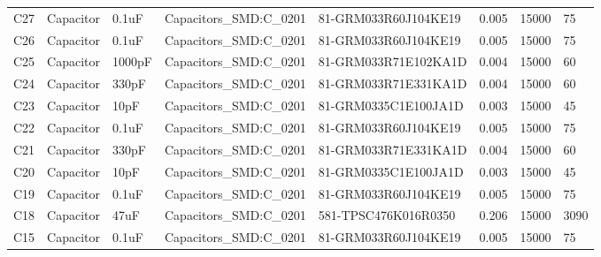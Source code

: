 \begin{landscape}
\begin{table}[]
\begin{tabular}{llllllll}
C27            & Capacitor     & 0.1uF                      & Capacitors\_SMD:C\_0201         & 81-GRM033R60J104KE19                 & 0.005                & 15000           & 75                   \\
C26            & Capacitor     & 0.1uF                      & Capacitors\_SMD:C\_0201         & 81-GRM033R60J104KE19                 & 0.005                & 15000           & 75                   \\
C25            & Capacitor     & 1000pF                     & Capacitors\_SMD:C\_0201         & 81-GRM033R71E102KA1D                 & 0.004                & 15000           & 60                   \\
C24            & Capacitor     & 330pF                      & Capacitors\_SMD:C\_0201         & 81-GRM033R71E331KA1D                 & 0.004                & 15000           & 60                   \\
C23            & Capacitor     & 10pF                       & Capacitors\_SMD:C\_0201         & 81-GRM0335C1E100JA1D                 & 0.003                & 15000           & 45                   \\
C22            & Capacitor     & 0.1uF                      & Capacitors\_SMD:C\_0201         & 81-GRM033R60J104KE19                 & 0.005                & 15000           & 75                   \\
C21            & Capacitor     & 330pF                      & Capacitors\_SMD:C\_0201         & 81-GRM033R71E331KA1D                 & 0.004                & 15000           & 60                   \\
C20            & Capacitor     & 10pF                       & Capacitors\_SMD:C\_0201         & 81-GRM0335C1E100JA1D                 & 0.003                & 15000           & 45                   \\
C19            & Capacitor     & 0.1uF                      & Capacitors\_SMD:C\_0201         & 81-GRM033R60J104KE19                 & 0.005                & 15000           & 75                   \\
C18            & Capacitor     & 47uF                       & Capacitors\_SMD:C\_0201         & 581-TPSC476K016R0350                 & 0.206                & 15000           & 3090                 \\
C15            & Capacitor     & 0.1uF                      & Capacitors\_SMD:C\_0201         & 81-GRM033R60J104KE19                 & 0.005                & 15000           & 75                   \\

\end{tabular}
\end{table}
\end{landscape}
